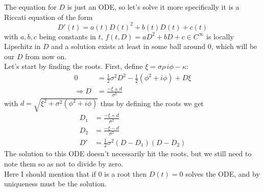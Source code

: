 The equation for $D$ is just an ODE, so let's solve it more specifically it is a Riccati equation of the form
\begin{equation}D'(t)=a(t)D(t)^2+b(t)D(t)+c(t)\end{equation}
with $a,b,c$ being constants in $t$, $f(t,D)= aD^2+bD+c \in C^\infty$ is locally Lipschitz in $D$ and a solution exists at least in some ball around $0$, which will be our $D$ from now on.\\
Let's start by finding the roots. First, define $\xi =\sigma \rho\, i\phi -\kappa$:
\begin{align}
0&= \frac{1}{2}\sigma^2 D^2-\frac{1}{2}(\phi^2 + i\phi)+D\xi\\
\Rightarrow D&=\frac{-\xi\pm d}{\sigma^2}
\end{align}
with $d=\sqrt{\xi^2+\sigma^2(\phi^2+i\phi)}$
thus by defining the roots we get
\begin{align}
D_1 &= \frac{-\xi+ d}{\sigma^2}\\
D_2 &=\frac{-\xi- d}{\sigma^2}\\
D'&=\frac{1}{2}\sigma^2(D-D_1)(D-D_2)
\end{align}
The solution to this ODE doesn't necessarily hit the roots, but we still need to note them so as not to divide by zero.\\
Here I should mention that if $0$ is a root then $D(t)=0$ solves the ODE, and by uniqueness must be the solution.


